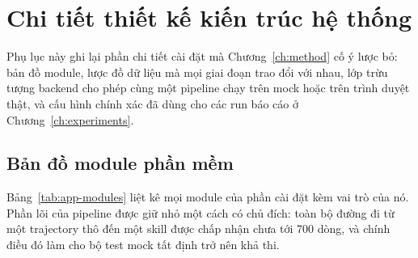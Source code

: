 \chapter{Chi tiết thiết kế kiến trúc hệ thống}
\label{app:design}

Phụ lục này ghi lại phần chi tiết cài đặt mà Chương~\ref{ch:method} cố ý lược
bỏ: bản đồ module, lược đồ dữ liệu mà mọi giai đoạn trao đổi với nhau, lớp
trừu tượng backend cho phép cùng một pipeline chạy trên mock hoặc trên trình
duyệt thật, và cấu hình chính xác đã dùng cho các run báo cáo ở
Chương~\ref{ch:experiments}.

\section{Bản đồ module phần mềm}
\label{app:design-modules}

Bảng~\ref{tab:app-modules} liệt kê mọi module của phần cài đặt kèm vai trò của
nó. Phần lõi của pipeline được giữ nhỏ một cách có chủ đích: toàn bộ đường đi
từ một trajectory thô đến một skill được chấp nhận chưa tới 700 dòng, và chính
điều đó làm cho bộ test mock tất định trở nên khả thi.

